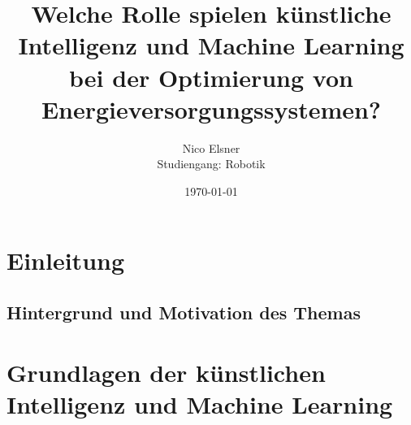 \documentclass[
11pt, 
a4paper,
DIV = 14,
twoside,
twocolumn, %
parskip =half, %
headsepline, %
openright, %
]{scrreprt}
\begin{document}
	
	\title{Welche Rolle spielen künstliche Intelligenz und Machine Learning bei der Optimierung von Energieversorgungssystemen?}
	\author{Nico Elsner\\
		Studiengang: Robotik}
	\date{\today}
	\maketitle

	\clearpage
	\begingroup
	  \pagestyle{empty}
	  \renewcommand*\chapterpagestyle{empty}
	  \tableofcontents 
	\clearpage
	\endgroup
	
	\thispagestyle{empty}

	\chapter{Einleitung}
	\setcounter{page}{1}
	\section{Hintergrund und Motivation des Themas}
	


	\chapter{Grundlagen der künstlichen Intelligenz und Machine Learning}
	
\end{document}
